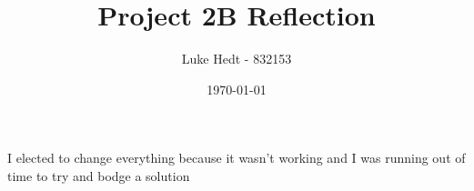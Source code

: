 \documentclass[a4 paper, 12pt]{article}
\title{Project 2B Reflection}
\author{Luke Hedt - 832153}
\date{\today}
\begin{document}
\maketitle
I elected to change everything because it wasn't working and I was running out of time to try and bodge a solution
\end{document}
